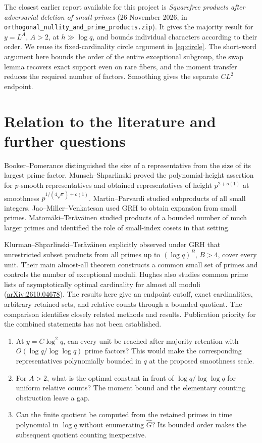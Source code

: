 \documentclass[11pt]{article}
\begin{document}
The closest earlier report available for this project is
\emph{Squarefree products after adversarial deletion of small primes}
(26 November 2026, in \texttt{orthogonal\_nullity\_and\_prime\_products.zip}).
It gives the majority result for $y=L^A$, $A>2$, at $h\gg\log q$, and
bounds individual characters according to their order. We reuse its
fixed-cardinality circle argument in \eqref{eq:circle}. The short-word
argument here bounds the order of the entire exceptional subgroup, the
swap lemma recovers exact support even on rare fibers, and the moment
transfer reduces the required number of factors. Smoothing gives the
separate $CL^2$ endpoint.
\section{Relation to the literature and further questions}
Booker--Pomerance \cite{bp} distinguished the size of a representative
from the size of its largest prime factor. Munsch--Shparlinski \cite{ms}
proved the polynomial-height assertion for $p$-smooth representatives and
obtained representatives of height $p^{2+o(1)}$ at smoothness
$p^{1/(4\sqrt e)+o(1)}$. Martin--Parvardi \cite{mp} studied subproducts of
all small integers. Jao--Miller--Venkatesan \cite{jmv} used GRH to obtain
expansion from small primes. Matom\"aki--Ter\"av\"ainen \cite{mt} studied
products of a bounded number of much larger primes and identified the role
of small-index cosets in that setting.

Klurman--Shparlinski--Ter\"av\"ainen \cite{kst} explicitly observed under GRH
that unrestricted subset products from all primes up to $(\log q)^B$, $B>4$,
cover every unit. Their main almost-all theorem constructs a common small
set of primes and controls the number of exceptional moduli. Hughes also studies
common prime lists of asymptotically optimal cardinality for almost all moduli
(\href{https://arxiv.org/abs/2610.04678}{arXiv:2610.04678}). The results
here give an endpoint cutoff, exact cardinalities, arbitrary retained sets,
and relative counts through a bounded quotient. The comparison identifies
closely related methods and results. Publication priority for the combined
statements has not been established.
\begin{enumerate}
\item At $y=C\log^2 q$, can every unit be reached after majority retention
with $O(\log q/\log\log q)$ prime factors? This would make the corresponding
representatives polynomially bounded in $q$ at the proposed smoothness scale.
\item For $A>2$, what is the optimal constant in front of
$\log q/\log\log q$ for uniform relative counts? The moment bound and the
elementary counting obstruction leave a gap.
\item Can the finite quotient be computed from the retained primes in time
polynomial in $\log q$ without enumerating $\widehat G$? Its bounded order
makes the subsequent quotient counting inexpensive.
\end{enumerate}
\end{document}
